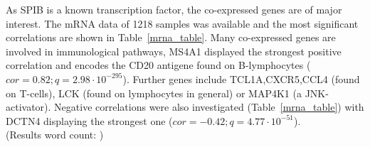 As SPIB is a known transcription factor, the co-expressed genes are of major interest.
The mRNA data of 1218 samples was available and the most significant correlations are shown in Table~\ref{mrna_table}.
Many co-expressed genes are involved in immunological pathways, MS4A1 displayed the strongest positive correlation and encodes the CD20 antigene found on B-lymphocytes ($cor = 0.82; q = 2.98 \cdot 10^{-295}$).
Further genes include TCL1A,CXCR5,CCL4 (found on T-cells), LCK (found on lymphocytes in general) or MAP4K1 (a JNK-activator).
Negative correlations were also investigated (Table~\ref{mrna_table}) with DCTN4 displaying the strongest one ($cor = -0.42; q = 4.77 \cdot 10^{-51}$).
\\
\endcountem 
(Results word count: \thewordcount{})